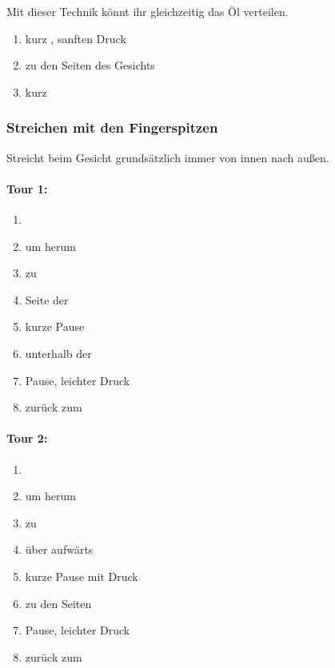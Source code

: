 Mit dieser Technik könnt ihr gleichzeitig das Öl verteilen.

\begin{enumerate}
  \item kurz , sanften Druck
  \item {} zu den Seiten des Gesichts
  \item kurz 
\end{enumerate}


\pagebreak
\subsubsection{Streichen mit den Fingerspitzen}

Streicht beim Gesicht grundsätzlich immer von innen nach außen.

\begin{multicols}{2}

\begin{oframed}
\paragraph{Tour 1:}
\begin{enumerate}
  \item {}
  \item um  herum
  \item zu 
  \item Seite der 
  \item {} kurze Pause
  \item unterhalb der 
  \item {} Pause, leichter Druck
  \item zurück zum 
\end{enumerate}
\end{oframed}

\columnbreak

\begin{oframed}
\paragraph{Tour 2:}
\begin{enumerate}
  \item {}
  \item um  herum
  \item zu 
  \item über  aufwärts
  \item {} kurze Pause mit Druck
  \item {} zu den Seiten
  \item {} Pause, leichter Druck
  \item zurück zum 
\end{enumerate}
\end{oframed}

\end{multicols}


